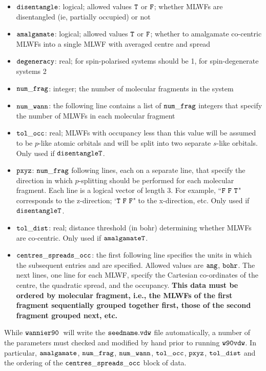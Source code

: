 \documentclass{report}
\newcommand{\wvdw}{{$\tt{w90vdw}$}}
\newcommand{\wannier}{{$\tt{wannier90}$}}
\begin{document}
\begin{itemize}
\item $\tt{disentangle}$: logical; allowed values $\tt{T}$ or
  $\tt{F}$; whether MLWFs are disentangled (ie, partially occupied) or
  not
\item $\tt{amalgamate}$: logical; allowed values $\tt{T}$ or
  $\tt{F}$; whether to amalgamate co-centric MLWFs into a single MLWF
  with averaged centre and spread
\item $\tt{degeneracy}$: real; for spin-polarised systems should be 1,
  for spin-degenerate systems 2
\item $\tt{num\_frag}$: integer; the number of molecular fragments in
    the system
\item $\tt{num\_wann}$: the following line contains
  a list of $\tt{num\_frag}$ integers that
  specify the number of MLWFs in each molecular fragment
\item $\tt{tol\_occ}$: real; MLWFs with occupancy less than this value
  will be assumed to be $p$-like atomic orbitals and will be split
  into two separate $s$-like orbitals. Only used if $\tt{disentangle
    T}$.
\item $\tt{pxyz}$: $\tt{num\_frag}$ following lines,
  each on a separate line, that specify the direction in which
  $p$-splitting should be performed for each molecular fragment. Each line
  is a logical vector of length 3. For example,
  ``$\tt{F\ F\ T}$" corresponds to the z-direction; `$\tt{T\ F\ F}$" to the x-direction,
  etc. Only used if $\tt{disentangle
    T}$.
\item $\tt{tol\_dist}$: real; distance threshold (in bohr) determining whether
  MLWFs are co-centric. Only used if $\tt{amalgamate T}$.
\item $\tt{centres\_spreads\_occ}$: the first following line
   specifies the units in which the subsequent entries
  and are specified. Allowed values are $\tt{ang}$,
  $\tt{bohr}$. The next lines, one line for each MLWF,
  specify the Cartesian co-ordinates of the centre, the quadratic
  spread, and the occupancy. \textbf{This data must be ordered by molecular
    fragment, i.e., the MLWFs of the first fragment sequentially grouped together
    first, those of the second fragment grouped next, etc.}
\end{itemize}

While \wannier\ will write the $\tt{seedname.vdw}$ file
automatically, a number of the parameters must checked and modified by hand
prior to running \wvdw. In particular, $\tt{amalgamate}$,
$\tt{num\_frag}$, $\tt{num\_wann}$, $\tt{tol\_occ}$, $\tt{pxyz}$,
  $\tt{tol\_dist}$ and the ordering of the
  $\tt{centres\_spreads\_occ}$ block of data.
\end{document}
